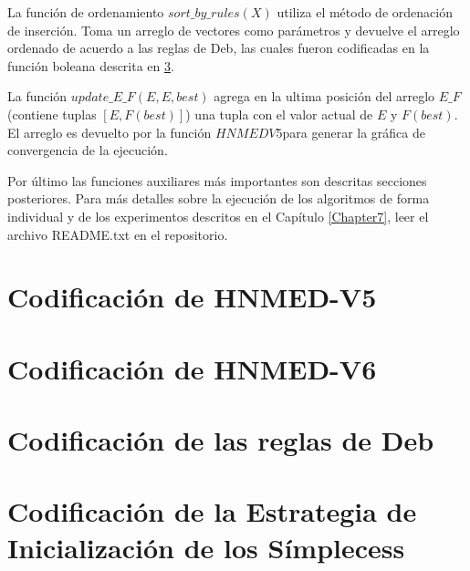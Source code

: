  La función de ordenamiento $sort\_by\_rules(X)$ utiliza el método de ordenación de inserción. Toma un arreglo de vectores como parámetros y devuelve el arreglo ordenado de acuerdo a las reglas de Deb, las cuales fueron codificadas en la función boleana descrita en \ref{sec:Debs rules}.
 
 La función $update\_E\_F(E,E,best)$ agrega en la ultima posición del arreglo $E\_F$(contiene tuplas $\left[ E,F(best)\right]$) una tupla con el valor actual de $E$ y $F(best)$. El arreglo es devuelto por la función $HNMEDV5$para generar la gráfica de convergencia de la ejecución.
 
Por último las funciones auxiliares más importantes son descritas secciones posteriores. Para más detalles sobre la ejecución de los algoritmos de forma individual y de los experimentos descritos en el Capítulo \ref{Chapter7}, leer el archivo README.txt en el repositorio.     
 
\section{Codificación de HNMED-V5 }

\section{Codificación de HNMED-V6 }

\section{Codificación de las reglas de Deb}\label{sec:Debs rules}

\section{Codificación de la Estrategia de Inicialización de los Símplecess}

